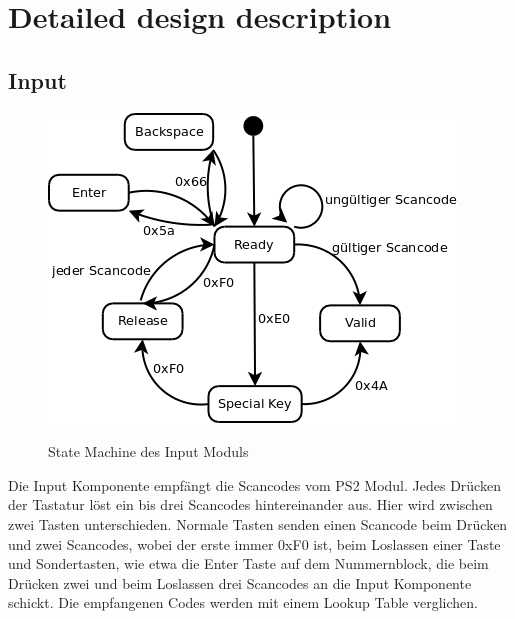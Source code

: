 \section{Detailed design description}



\subsection{Input}

\begin{figure}[!ht]
 \caption{State Machine des Input Moduls}
 \centering
 \includegraphics[scale=0.55]{pics/Input.png}
 \label{fig:Modules}
\end{figure}

Die Input Komponente empfängt die Scancodes vom PS2 Modul. Jedes Drücken der Tastatur löst ein bis drei Scancodes hintereinander aus.
Hier wird zwischen zwei Tasten unterschieden. Normale Tasten senden einen Scancode beim Drücken und zwei Scancodes, wobei der erste immer 0xF0 ist, 
beim Loslassen einer Taste und Sondertasten, wie etwa die Enter Taste auf dem Nummernblock, die beim Drücken zwei und beim Loslassen drei Scancodes 
an die Input Komponente schickt. 
Die empfangenen Codes werden mit einem Lookup Table verglichen.

